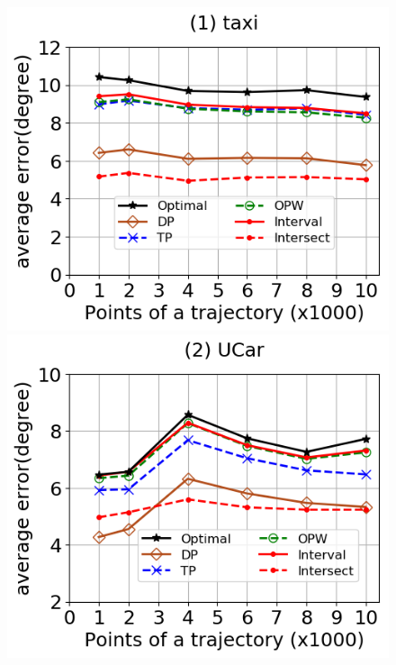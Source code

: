 \begin{figure}[tb!]
	\centering
	\includegraphics[scale=0.315]{Figures/Exp-DAD-error-size-taxi.png} \hspace{1ex}
	\includegraphics[scale=0.315]{Figures/Exp-DAD-error-size-service.png}	\hspace{1ex}

\end{figure}

